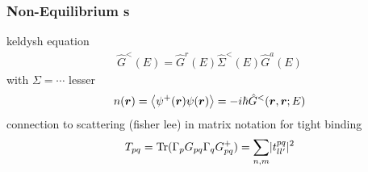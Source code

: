 \subsubsection{Non-Equilibrium \cgfnc s}
keldysh equation
\begin{align}
\hat{G}^<(E) = \hat{G}^r(E) \hat{\Sigma}^<(E) \hat{G}^a(E)
\label{eqn:keldyshequation}
\end{align}
with $\Sigma = \dotsb$
lesser \gfnc{}
\begin{align}
	n(\boldsymbol{r}) = \left< \psi^+ (\boldsymbol{r}) \psi(\boldsymbol{r})\right> = -i\hbar \hat{G}^<(\boldsymbol{r},\boldsymbol{r};E)
\end{align}
connection to scattering (fisher lee) in matrix notation for tight binding
\begin{align}
T_{pq} = \text{Tr}(\Gamma_p G_{pq} \Gamma_q G^+_{pq}) = \sum_{n,m} \lvert t^{pq}_{ll'}\rvert^2
\end{align}

